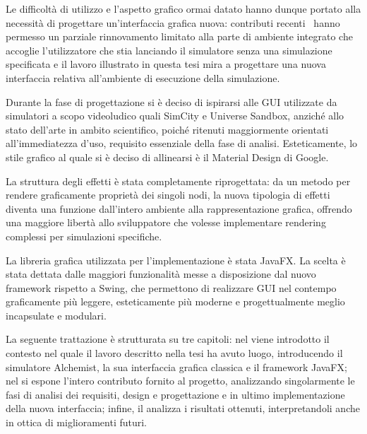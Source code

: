     Le difficoltà di utilizzo e l'aspetto grafico ormai datato hanno dunque portato alla necessità di progettare un'interfaccia grafica nuova: contributi recenti~\cite{casadio} hanno permesso un parziale rinnovamento limitato alla parte di ambiente integrato che accoglie l'utilizzatore che stia lanciando il simulatore senza una simulazione specificata e il lavoro illustrato in questa tesi mira a progettare una nuova interfaccia relativa all'ambiente di esecuzione della simulazione.

    Durante la fase di progettazione si è deciso di ispirarsi alle GUI utilizzate da simulatori a scopo videoludico quali SimCity e Universe Sandbox, anziché allo stato dell'arte in ambito scientifico, poiché ritenuti maggiormente orientati all'immediatezza d'uso, requisito essenziale della fase di analisi.
    Esteticamente, lo stile grafico al quale si è deciso di allinearsi è il Material Design di Google.

    La struttura degli effetti è stata completamente riprogettata:
    da un metodo per rendere graficamente proprietà dei singoli nodi, la nuova tipologia di effetti diventa una funzione dall'intero ambiente alla rappresentazione grafica, offrendo una maggiore libertà allo sviluppatore che volesse implementare rendering complessi per simulazioni specifiche.

    La libreria grafica utilizzata per l'implementazione è stata JavaFX.
    La scelta è stata dettata dalle maggiori funzionalità messe a disposizione dal nuovo framework rispetto a Swing, che permettono di realizzare GUI nel contempo graficamente più leggere, esteticamente più moderne e progettualmente meglio incapsulate e modulari.

    \bigskip

    La seguente trattazione è strutturata su tre capitoli: nel  viene introdotto il contesto nel quale il lavoro descritto nella tesi ha avuto luogo, introducendo il simulatore Alchemist, la sua interfaccia grafica classica e il framework JavaFX;
    nel  si espone l'intero contributo fornito al progetto, analizzando singolarmente le fasi di analisi dei requisiti, design e progettazione e in ultimo implementazione della nuova interfaccia;
    infine, il  analizza i risultati ottenuti, interpretandoli anche in ottica di miglioramenti futuri.
